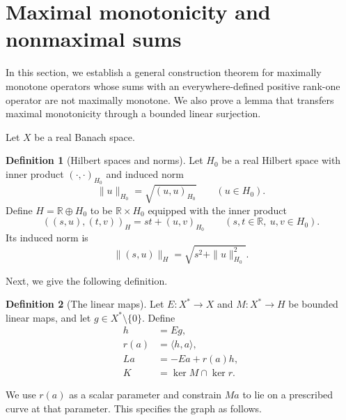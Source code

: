 \documentclass[11pt]{article}
\newcommand{\R}{\mathbb R}
\newcommand{\pair}[2]{\langle #1,#2\rangle}
\theoremstyle{definition}
\newtheorem{definition}{Definition}
\theoremstyle{remark}
\begin{document}
\section{Maximal monotonicity and nonmaximal sums}
\label{sec:endpoint-criterion}

In this section, we establish a general construction theorem for maximally monotone operators whose sums with an everywhere-defined positive rank-one operator are not maximally monotone. We also prove a lemma that transfers maximal monotonicity through a bounded linear surjection.





Let $X$ be a real Banach space.
\begin{definition}[Hilbert spaces and norms]
\label{def:hilbert-spaces-norms}
Let $H_0$ be a real Hilbert space with inner product $(\cdot,\cdot)_{H_0}$ and induced norm
\[
\|u\|_{H_0}=\sqrt{(u,u)_{H_0}}\qquad(u\in H_0).
\]
Define $H=\R\oplus H_0$ to be $\R\times H_0$ equipped with the inner product
\[
((s,u),(t,v))_H=st+(u,v)_{H_0}
\qquad(s,t\in\R,\ u,v\in H_0).
\]
Its induced norm is
\[
\|(s,u)\|_H=\sqrt{s^2+\|u\|_{H_0}^2}.
\]
\end{definition}
Next, we give the following definition.

\begin{definition}[The linear maps]
\label{def:construction-maps}
Let $E:X^*\to X$ and $M:X^*\to H$ be bounded linear maps, and let $g\in X^*\setminus\{0\}$. Define
\[
\begin{aligned}
h&=Eg,\\
r(a)&=\pair{h}{a},\\
La&=-Ea+r(a)h,\\
K&=\ker M\cap\ker r.
\end{aligned}
\]
\end{definition}

We use $r(a)$ as a scalar parameter and constrain $Ma$ to lie on a prescribed curve at that parameter. This specifies the graph as follows.
\end{document}

